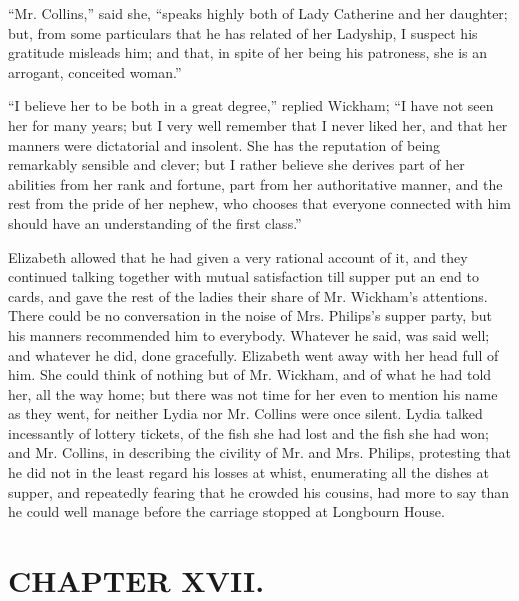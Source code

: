 ``Mr. Collins,'' said she, ``speaks highly both of Lady Catherine and her daughter; but, from some particulars that he has related of her Ladyship, I suspect his gratitude misleads him; and that, in spite of her being his patroness, she is an arrogant, conceited woman.''

``I believe her to be both in a great degree,'' replied Wickham; ``I have not seen her for many years; but I very well remember that I never liked her, and that her manners were dictatorial and insolent. She has the reputation of being remarkably sensible and clever; but I rather believe she derives part of her abilities from her rank and fortune, part from her authoritative manner, and the rest from the pride of her nephew, who chooses that everyone connected with him should have an understanding of the first class.''

Elizabeth allowed that he had given a very rational account of it, and they continued talking together with mutual satisfaction till supper put an end to cards, and gave the rest of the ladies their share of Mr. Wickham's attentions. There could be no conversation in the noise of Mrs. Philips's supper party, but his manners recommended him to everybody. Whatever he said, was said well; and whatever he did, done gracefully. Elizabeth went away with her head full of him. She could think of nothing but of Mr. Wickham, and of what he had told her, all the way home; but there was not time for her even to mention his name as they went, for neither Lydia nor Mr. Collins were once silent. Lydia talked incessantly of lottery tickets, of the fish she had lost and the fish she had won; and Mr. Collins, in describing the civility of Mr. and Mrs. Philips, protesting that he did not in the least regard his losses at whist, enumerating all the dishes at supper, and repeatedly fearing that he crowded his cousins, had more to say than he could well manage before the carriage stopped at Longbourn House.



\chapter{CHAPTER XVII.}

